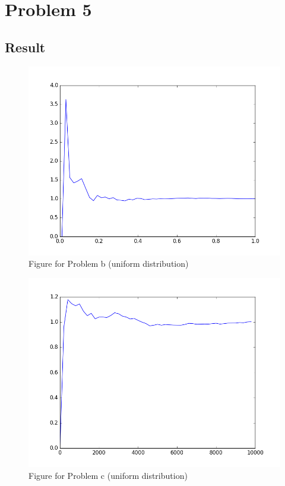 \documentclass[]{article}
\begin{document}
    \section{Problem 5}
    \subsection{Result}
    \begin{figure}[H]
        \centering
        \includegraphics[scale=0.4]{5_b.png}
        \caption{Figure for Problem b (uniform distribution)}
    \end{figure}
    \begin{figure}[H]
        \centering
        \includegraphics[scale=0.4]{5_c.png}
        \caption{Figure for Problem c (uniform distribution)}
    \end{figure}
\end{document}
